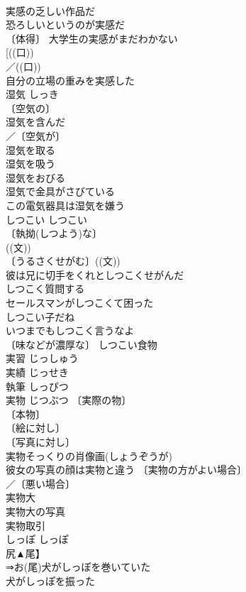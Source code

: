 \documentclass[8pt]{extreport}
\begin{document}
\begin{CJK}{UTF8}{min}
\\	実感の乏しい作品だ 
\\	恐ろしいというのが実感だ 
\\	〔体得〕 大学生の実感がまだわかない 
\\	[((口)) 
\\	／((口)) 
\\	自分の立場の重みを実感した 
\\	湿気	しっき	
\\	〔空気の〕
\\	湿気を含んだ 
\\	／〔空気が〕
\\	湿気を取る 
\\	湿気を吸う 
\\	湿気をおびる 
\\	湿気で金具がさびている 
\\	この電気器具は湿気を嫌う 
\\	しつこい	しつこい	
\\	〔執拗(しつよう)な〕
\\	((文)) 
\\	〔うるさくせがむ〕((文)) 
\\	彼は兄に切手をくれとしつこくせがんだ 
\\	しつこく質問する 
\\	セールスマンがしつこくて困った 
\\	しつこい子だね 
\\	いつまでもしつこく言うなよ 
\\	〔味などが濃厚な〕 しつこい食物 
\\	実習	じっしゅう	
\\	実績	じっせき	
\\	執筆	しっぴつ	
\\	実物	じつぶつ	〔実際の物〕
\\	〔本物〕
\\	〔絵に対し〕
\\	〔写真に対し〕
\\	実物そっくりの肖像画(しょうぞうが) 
\\	彼女の写真の顔は実物と違う 〔実物の方がよい場合〕
\\	／〔悪い場合〕
\\	実物大 
\\	実物大の写真 
\\	実物取引 
\\	しっぽ	しっぽ
\\	尻▲尾】	
\\	⇒お(尾)犬がしっぽを巻いていた
\\	犬がしっぽを振った

\end{CJK}
\end{document}
